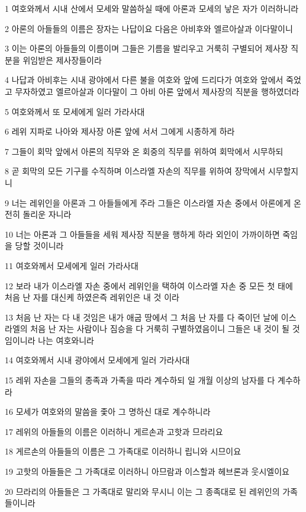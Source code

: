 \par 1 여호와께서 시내 산에서 모세와 말씀하실 때에 아론과 모세의 낳은 자가 이러하니라
\par 2 아론의 아들들의 이름은 장자는 나답이요 다음은 아비후와 엘르아살과 이다말이니
\par 3 이는 아론의 아들들의 이름이며 그들은 기름을 발리우고 거룩히 구별되어 제사장 직분을 위임받은 제사장들이라
\par 4 나답과 아비후는 시내 광야에서 다른 불을 여호와 앞에 드리다가 여호와 앞에서 죽었고 무자하였고 엘르아살과 이다말이 그 아비 아론 앞에서 제사장의 직분을 행하였더라
\par 5 여호와께서 또 모세에게 일러 가라사대
\par 6 레위 지파로 나아와 제사장 아론 앞에 서서 그에게 시종하게 하라
\par 7 그들이 회막 앞에서 아론의 직무와 온 회중의 직무를 위하여 회막에서 시무하되
\par 8 곧 회막의 모든 기구를 수직하며 이스라엘 자손의 직무를 위하여 장막에서 시무할지니
\par 9 너는 레위인을 아론과 그 아들들에게 주라 그들은 이스라엘 자손 중에서 아론에게 온전히 돌리운 자니라
\par 10 너는 아론과 그 아들들을 세워 제사장 직분을 행하게 하라 외인이 가까이하면 죽임을 당할 것이니라
\par 11 여호와께서 모세에게 일러 가라사대
\par 12 보라 내가 이스라엘 자손 중에서 레위인을 택하여 이스라엘 자손 중 모든 첫 태에 처음 난 자를 대신케 하였은즉 레위인은 내 것 이라
\par 13 처음 난 자는 다 내 것임은 내가 애굽 땅에서 그 처음 난 자를 다 죽이던 날에 이스라엘의 처음 난 자는 사람이나 짐승을 다 거룩히 구별하였음이니 그들은 내 것이 될 것임이니라 나는 여호와니라
\par 14 여호와께서 시내 광야에서 모세에게 일러 가라사대
\par 15 레위 자손을 그들의 종족과 가족을 따라 계수하되 일 개월 이상의 남자를 다 계수하라
\par 16 모세가 여호와의 말씀을 좇아 그 명하신 대로 계수하니라
\par 17 레위의 아들들의 이름은 이러하니 게르손과 고핫과 므라리요
\par 18 게르손의 아들들의 이름은 그 가족대로 이러하니 립니와 시므이요
\par 19 고핫의 아들들은 그 가족대로 이러하니 아므람과 이스할과 헤브론과 웃시엘이요
\par 20 므라리의 아들들은 그 가족대로 말리와 무시니 이는 그 종족대로 된 레위인의 가족들이니라
